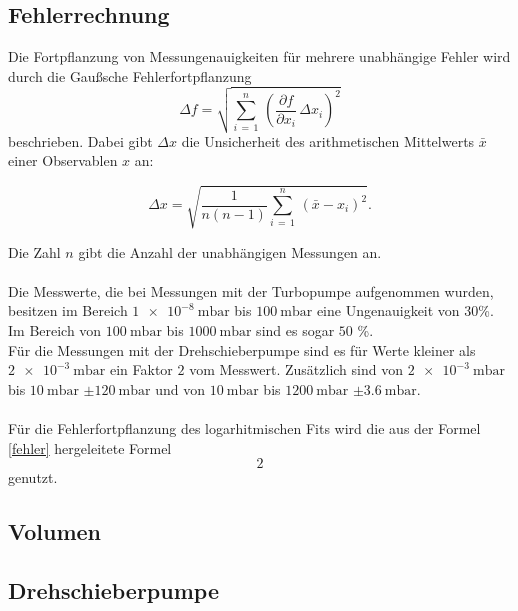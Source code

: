         \subsection{Fehlerrechnung}
        \noindent
        Die Fortpflanzung von Messungenauigkeiten für mehrere unabhängige Fehler wird durch die Gaußsche Fehlerfortpflanzung
        \begin{equation*}
        \Delta f = \sqrt{\sum_{i \, = \, 1}^{n} \, \left(\frac{\partial f}{\partial x_i} \, \Delta x_i\right)^2}
        \label{fehler}
        \end{equation*}
        beschrieben. Dabei gibt $\Delta x$ die Unsicherheit des arithmetischen Mittelwerts $\bar{x}$ einer Observablen $x$ an:
        
        \begin{equation*}
        \Delta x =  \sqrt{\frac{1}{n(n-1)} \sum_{i \, = \, 1}^{n} \, \left(\bar{x}- x_i\right)^2}.
        \end{equation*}

        \noindent
        Die Zahl $n$ gibt die Anzahl der unabhängigen Messungen an.\\\\
        Die Messwerte, die bei Messungen mit der Turbopumpe aufgenommen wurden, besitzen im Bereich $\SI{1e-8}{\milli\bar}$ bis $\SI{100}{\milli\bar}$ eine Ungenauigkeit von $30$\%.
        Im Bereich von $\SI{100}{\milli\bar}$ bis $\SI{1000}{\milli\bar}$ sind es sogar $50$ \%.\\
        Für die Messungen mit der Drehschieberpumpe sind es für Werte kleiner als $\SI{2e-3}{\milli\bar}$ ein Faktor $2$ vom Messwert.
        Zusätzlich sind von $\SI{2e-3}{\milli\bar}$ bis $\SI{10}{\milli\bar}$ $\pm \SI{120}{\milli\bar}$ und von $\SI{10}{\milli\bar}$ bis $\SI{1200}{\milli\bar}$ $\pm \SI{3.6}{\milli\bar}$.\\\\
        Für die Fehlerfortpflanzung des logarhitmischen Fits wird die aus der Formel \ref*{fehler} hergeleitete Formel 
        \begin{equation*}
          2
        \end{equation*}
        genutzt.

        \subsection*{Volumen}

        \subsection*{Drehschieberpumpe}



















